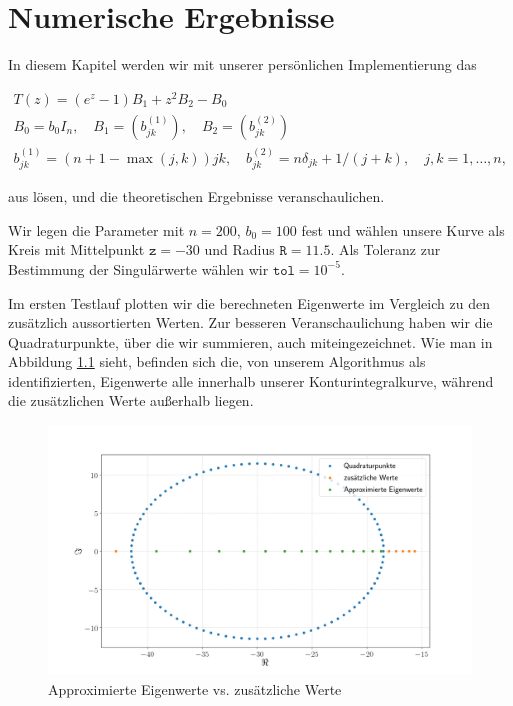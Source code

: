 \chapter{Numerische Ergebnisse}

In diesem Kapitel werden wir mit unserer persönlichen Implementierung das 

\begin{gather*}
    T(z) = (e^z - 1) B_1 + z^2 B_2 - B_0 \\
    B_0 = b_0 I_n,
    \quad
    B_1 = (b_{j k}^{(1)}),
    \quad
    B_2 = (b_{j k}^{(2)}) \\
    b_{j k}^{(1)} = (n + 1 - \max(j, k)) j k,
    \quad
    b_{j k}^{(2)} = n \delta_{j k} + 1 / (j + k),
    \quad
    j, k = 1, \dots, n,
\end{gather*}

aus \cite{saad2020rational} lösen, und die theoretischen Ergebnisse veranschaulichen.

Wir legen die Parameter mit $n = 200$, $b_0 = 100$ fest und wählen unsere Kurve als Kreis mit Mittelpunkt $\texttt{z} = -30$ und Radius $\texttt{R} = 11.5$.
Als Toleranz zur Bestimmung der  Singulärwerte wählen wir $\texttt{tol} = 10^{-5}$.

Im ersten Testlauf plotten wir die berechneten Eigenwerte im Vergleich zu den zusätzlich aussortierten Werten.
Zur besseren Veranschaulichung haben wir die Quadraturpunkte, über die wir summieren, auch miteingezeichnet.
Wie man in Abbildung \ref{fig:plot1} sieht, befinden sich die, von unserem Algorithmus als  identifizierten, Eigenwerte alle innerhalb unserer Konturintegralkurve, während die zusätzlichen Werte außerhalb liegen.

\begin{figure}[H]
  \includegraphics[width = \linewidth]{Plots/eigenwerte_complex_plot.png}
  \caption{Approximierte Eigenwerte vs. zusätzliche Werte}
  \label{fig:plot1}
\end{figure}



